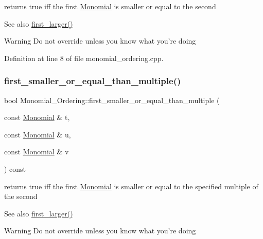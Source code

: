 returns {\ttfamily true} iff the first \hyperlink{class_monomial}{Monomial} is smaller or equal to the second 

\begin{DoxySeeAlso}{See also}
\hyperlink{class_monomial___ordering_aed41fe82e1ca5cd287a93d287fee7c20}{first\+\_\+larger()} 
\end{DoxySeeAlso}
\begin{DoxyWarning}{Warning}
Do not override unless you know what you're doing 
\end{DoxyWarning}


Definition at line 8 of file monomial\+\_\+ordering.\+cpp.

\mbox{\label{class_monomial___ordering_a0ed5bf2b1da5daaa67aaba00f8c6cbd0}} 
\subsubsection{\texorpdfstring{first\+\_\+smaller\+\_\+or\+\_\+equal\+\_\+than\+\_\+multiple()}{first\_smaller\_or\_equal\_than\_multiple()}}
{\footnotesize\ttfamily bool Monomial\+\_\+\+Ordering\+::first\+\_\+smaller\+\_\+or\+\_\+equal\+\_\+than\+\_\+multiple (\begin{DoxyParamCaption}\item[{const \hyperlink{class_monomial}{Monomial} \&}]{t,  }\item[{const \hyperlink{class_monomial}{Monomial} \&}]{u,  }\item[{const \hyperlink{class_monomial}{Monomial} \&}]{v }\end{DoxyParamCaption}) const}



returns {\ttfamily true} iff the first \hyperlink{class_monomial}{Monomial} is smaller or equal to the specified multiple of the second 

\begin{DoxySeeAlso}{See also}
\hyperlink{class_monomial___ordering_aed41fe82e1ca5cd287a93d287fee7c20}{first\+\_\+larger()} 
\end{DoxySeeAlso}
\begin{DoxyWarning}{Warning}
Do not override unless you know what you're doing 
\end{DoxyWarning}


